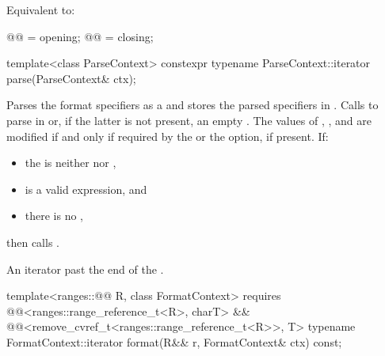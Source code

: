 \documentclass{wg21}
\begin{document}
\begin{itemdescr}
\pnum
\effects
Equivalent to:
\begin{codeblock}
    @@ = opening;
    @@ = closing;
\end{codeblock}
\end{itemdescr}

%
\begin{itemdecl}
template<class ParseContext>
constexpr typename ParseContext::iterator
parse(ParseContext& ctx);
\end{itemdecl}

\begin{itemdescr}
\pnum
\effects
Parses the format specifiers as a  and
stores the parsed specifiers in .
Calls  to parse
 in  or,
if the latter is not present, an empty .
The values of
, , and 
are modified if and only if required by
the  or the  option, if present.
If:
\begin{itemize}
    \item
    the  is neither  nor ,
    \item
     is a valid expression, and
    \item
    there is no ,
\end{itemize}
then calls .

\pnum\textbf{}
\returns
An iterator past the end of the .
\end{itemdescr}

%
\begin{itemdecl}
template<ranges::@@ R, class FormatContext>
requires @@<ranges::range_reference_t<R>, charT> &&
@@<remove_cvref_t<ranges::range_reference_t<R>>, T>
typename FormatContext::iterator
format(R&& r, FormatContext& ctx) const;
\end{itemdecl}
\end{document}
